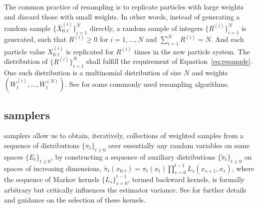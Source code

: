 \documentclass[11pt,bib,hyper]{marticle}
\begin{document}
The common practice of resampling is to replicate particles with large weights
and discard those with small weights. In other words, instead of generating a
random sample $\{\bar{X}_{0:t}^{(i)}\}_{i=1}^N$ directly, a random sample of
integers $\{R^{(i)}\}_{i=1}^N$ is generated, such that $R^{(i)} \ge 0$ for $i
= 1,\dots,N$ and $\sum_{i=1}^N R^{(i)} = N$. And each particle value
$X_{0:t}^{(i)}$ is replicated for $R^{(i)}$ times in the new particle system.
The distribution of $\{R^{(i)}\}_{i=1}^N$ shall fulfill the requirement of
Equation~\ref{eq:resample}. One such distribution is a multinomial
distribution of size $N$ and weights $(W_t^{(i)},\dots,W_t^{(N)})$. See
\textcite{Douc:2005wa} for some commonly used resampling algorithms.

\subsection[SMC samplers]{\protect\smc samplers}
\label{sub:SMC Samplers}

\smc samplers allow us to obtain, iteratively, collections of weighted samples
from a sequence of distributions $\{\pi_t\}_{t\ge0}$ over essentially any
random variables on some spaces $\{E_t\}_{t\ge0}$, by constructing a sequence
of auxiliary distributions $\{\tilde\pi_t\}_{t\ge0}$ on spaces of increasing
dimensions, $\tilde\pi_t(x_{0:t})=\pi_t (x_t) \prod_{s=0}^{t-1}
L_s(x_{s+1},x_s)$, where the sequence of Markov kernels $\{L_s\}_{s=0}^{t-1}$,
termed backward kernels, is formally arbitrary but critically influences the
estimator variance. See \textcite{DelMoral:2006hc} for further details and
guidance on the selection of these kernels.
\end{document}
